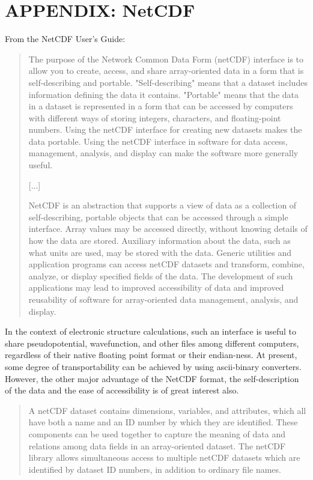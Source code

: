 \documentclass[11pt]{article}
\begin{document}
\newpage
\section{APPENDIX: NetCDF}
From the NetCDF User's Guide:

\begin{quotation}
   The purpose of the Network Common Data Form (netCDF) interface is to
   allow you to create, access, and share array-oriented data in a form 
   that is self-describing and portable. "Self-describing" means that a
   dataset includes information defining the data it contains. "Portable"
   means that the data in a dataset is represented in a form that can be
   accessed by computers with different ways of storing integers,     
   characters, and floating-point numbers. Using the netCDF interface for
   creating new datasets makes the data portable. Using the netCDF 
   interface in software for data access, management, analysis, and  
   display can make the software more generally useful.

   [...] 

   NetCDF is an abstraction that supports a view of data as a collection
   of self-describing, portable objects that can be accessed through a
   simple interface. Array values may be accessed directly, without
   knowing details of how the data are stored. Auxiliary information
   about the data, such as what units are used, may be stored with the
   data. Generic utilities and application programs can access netCDF
   datasets and transform, combine, analyze, or display specified fields
   of the data. The development of such applications may lead to improved
   accessibility of data and improved reusability of software for
   array-oriented data management, analysis, and display. 

\end{quotation}

In the context of electronic structure calculations, such an interface
is useful to share pseudopotential, wavefunction, and other
files among different computers, regardless of their native floating
point format or their endian-ness. At present, some degree of
transportability can be achieved by using ascii-binary converters.
However, the other major advantage of the
NetCDF format, the self-description of the data and the ease of
accessibility is of great interest also.

\begin{quotation}
   A netCDF dataset contains dimensions, variables, and attributes, which
   all have both a name and an ID number by which they are identified.   
   These components can be used together to capture the meaning of data 
   and relations among data fields in an array-oriented dataset. The
   netCDF library allows simultaneous access to multiple netCDF datasets
   which are identified by dataset ID numbers, in addition to ordinary
   file names.           
\end{quotation}
\end{document}
